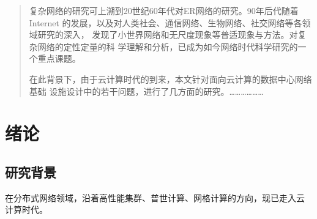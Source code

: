 \maketitle

\makeoriginalitypage

\frontmatter

\begin{abstract}
复杂网络的研究可上溯到20世纪60年代对ER网络的研究。90年后代随着Internet
的发展，以及对人类社会、通信网络、生物网络、社交网络等各领域研究的深入，
发现了小世界网络和无尺度现象等普适现象与方法。对复杂网络的定性定量的科
学理解和分析，已成为如今网络时代科学研究的一个重点课题。

在此背景下，由于云计算时代的到来，本文针对面向云计算的数据中心网络基础
设施设计中的若干问题，进行了几方面的研究。………………
\end{abstract}

\begin{englishabstract}
\blindtext
\end{englishabstract}

\tableofcontents

\mainmatter

\chapter{绪论}\label{chapter_introduction}
\section{研究背景}

在分布式网络领域，沿着高性能集群、普世计算、网格计算的方向，现已走入云
计算时代。


